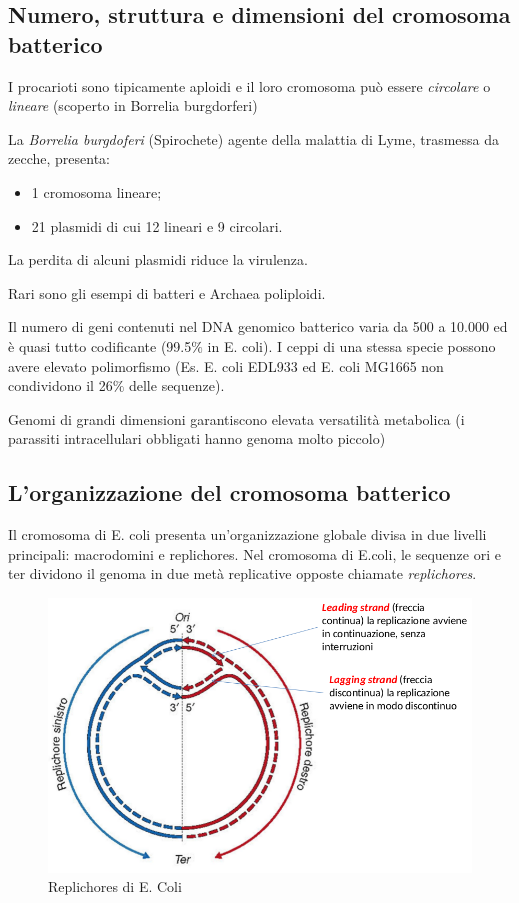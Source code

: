 \documentclass[11pt]{book}
\begin{document}
\subsection{Numero, struttura e dimensioni del cromosoma batterico} 
I procarioti sono tipicamente aploidi e il loro cromosoma può essere \emph{circolare} o \emph{lineare} (scoperto in Borrelia burgdorferi) 

La \emph{Borrelia burgdoferi} (Spirochete) agente della malattia di Lyme, trasmessa da zecche, presenta:
\begin{itemize}
\item 1 cromosoma lineare;
\item 21 plasmidi di cui 12 lineari e 9 circolari.
\end{itemize}
 
La perdita di alcuni plasmidi riduce la virulenza.

Rari sono gli esempi di batteri e Archaea poliploidi.

\vspace{1em}
Il numero di geni contenuti nel DNA genomico batterico varia da 500 a 10.000 ed è quasi tutto codificante (99.5$\%$ in E. coli). 
I ceppi di una stessa specie possono avere elevato polimorfismo (Es. E. coli EDL933 ed E. coli MG1665 non condividono il 26$\%$ delle sequenze).
 
\vspace{1em}
Genomi di grandi dimensioni garantiscono elevata versatilità metabolica (i parassiti intracellulari obbligati hanno genoma molto piccolo)

\subsection{L'organizzazione del cromosoma batterico} 
Il cromosoma di E. coli presenta un'organizzazione globale divisa in due livelli principali: macrodomini e replichores.
Nel cromosoma di E.coli, le sequenze ori e ter dividono il genoma in due metà replicative opposte chiamate \emph{replichores}.

\begin{figure}[htp]
\centering
\includegraphics[scale=0.4]{img/Replichores.png}
\caption{Replichores di E. Coli}
\label{}
\end{figure}
\end{document}
